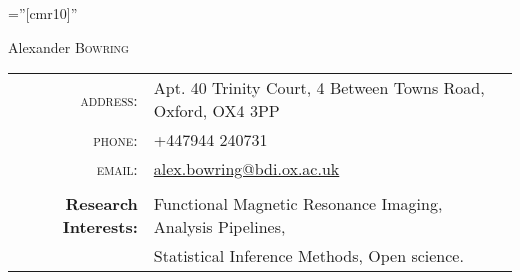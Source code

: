 \documentclass[a4paper,10pt]{article}
\begin{document}

\pagestyle{empty} %

\font\fb=''[cmr10]'' %

\par{\centering
		{\Huge Alexander \textsc{Bowring}
	}\bigskip\par}

\begin{center}
\begin{tabular}{rl}
	\textsc{address:} & Apt. 40 Trinity Court, 4 Between Towns Road, Oxford, OX4 3PP \\
	\textsc{phone:} & +447944 240731\\
    \textsc{email:}     & \href{mailto:alex.bowring@bdi.ox.ac.uk}{alex.bowring@bdi.ox.ac.uk}\\
    \\
    \textbf{Research Interests:} & Functional Magnetic Resonance Imaging, Analysis Pipelines, \\& Statistical Inference Methods, Open science.
\end{tabular}
\end{center}



\end{document}
